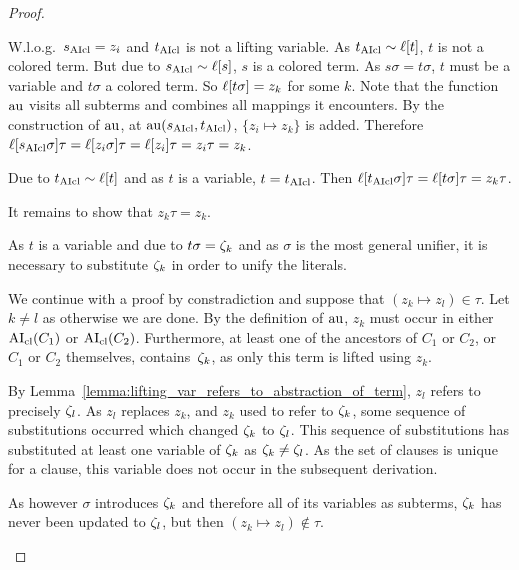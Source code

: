 \documentclass[,%
	paper=a4,%
	DIV12, %
	twoside=false,%
	liststotoc,
	bibtotoc,
	draft=false,%
	numbers=noendperiod
]{scrartcl}
\begin{document}
\begin{proof}
\begin{description}
\begin{compactitem}
			\item W.l.o.g.~$s_{\operatorname{AIcl}} = z_i$ and $t_{\operatorname{AIcl}}$ is not a lifting variable.
				As $t_{\operatorname{AIcl}} \sim \ell[t]$, $t$ is not a colored term.
				But due to $s_{\operatorname{AIcl}} \sim \ell[s]$, $s$ is a colored term.
				As $s\sigma = t\sigma$, $t$ must be a variable and $t\sigma$ a colored term.
				So $\ell[t\sigma] = z_k$ for some $k$.
				Note that the function $\operatorname{au}$ visits all subterms and combines all mappings it encounters.
				By the construction of $\operatorname{au}$, at $\operatorname{au}(s_{\operatorname{AIcl}}, t_{\operatorname{AIcl}})$, $\{ z_i \mapsto z_k \}$ is added.
				Therefore $\ell[s_{\operatorname{AIcl}}\sigma]\tau = \ell[z_i\sigma]\tau = \ell[z_i]\tau = z_i\tau = z_k$.

				Due to $t_{\operatorname{AIcl}} \sim \ell[t]$ and as $t$ is a variable, $t=t_{\operatorname{AIcl}}$.
				Then $\ell[t_{\operatorname{AIcl}}\sigma]\tau = \ell[t\sigma]\tau = z_k\tau$.

				It remains to show that $z_k\tau = z_k$.

				As $t$ is a variable and due to $t\sigma = \zeta_{k}$ and as $\sigma$ is the most general unifier, it is necessary to substitute $\zeta_{k}$ in order to unify the literals. 

				We continue with a proof by constradiction and suppose that $(z_k \mapsto z_l) \in \tau$. Let $k\neq l$ as otherwise we are done.
				By the definition of $\operatorname{au}$, $z_k$ must occur in either $\operatorname{AI}_\mathrm{cl}(C_1)$ or $\operatorname{AI}_\mathrm{cl}(C_2)$.
				 Furthermore, at least one of the ancestors of $C_1$ or $C_2$, or $C_1$ or $C_2$ themselves, contains~$\zeta_{k}$, as only this term is lifted using $z_k$.

				By Lemma~\ref{lemma:lifting_var_refers_to_abstraction_of_term}, $z_l$ refers to precisely $\zeta_{l}$. %
				As $z_l$ replaces $z_k$, and $z_k$ used to refer to $\zeta_{k}$,
				some sequence of substitutions occurred which changed $\zeta_{k}$ to $\zeta_{l}$.
				This sequence of substitutions has substituted at least one variable of $\zeta_{k}$ as $\zeta_{k}\neq\zeta_{l}$.
				As the set of clauses is unique for a clause, this variable does not occur in the subsequent derivation.

				As however $\sigma$ introduces $\zeta_{k}$ and therefore all of its variables as subterms, 
				$\zeta_{k}$ has never been updated to $\zeta_{l}$, but then $(z_k \mapsto z_l) \not\in \tau$.


\end{compactitem}
\end{description}
\end{proof}
\end{document}
